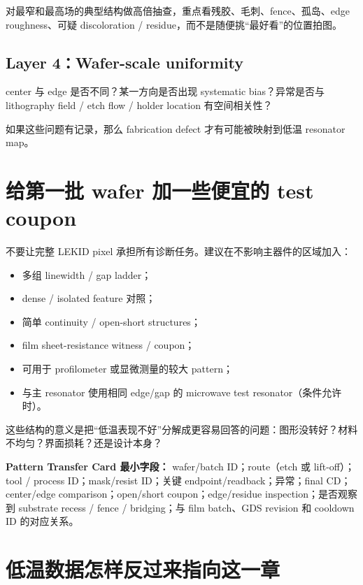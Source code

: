 对最窄和最高场的典型结构做高倍抽查，重点看残胶、毛刺、fence、孤岛、edge roughness、可疑 discoloration / residue，而不是随便挑“最好看”的位置拍图。

\subsection{Layer 4：Wafer-scale uniformity}

center 与 edge 是否不同？某一方向是否出现 systematic bias？异常是否与 lithography field / etch flow / holder location 有空间相关性？

如果这些问题有记录，那么 fabrication defect 才有可能被映射到低温 resonator map。

\section{给第一批 wafer 加一些便宜的 test coupon}

不要让完整 LEKID pixel 承担所有诊断任务。建议在不影响主器件的区域加入：

\begin{itemize}
  \item 多组 linewidth / gap ladder；
  \item dense / isolated feature 对照；
  \item 简单 continuity / open-short structures；
  \item film sheet-resistance witness / coupon；
  \item 可用于 profilometer 或显微测量的较大 pattern；
  \item 与主 resonator 使用相同 edge/gap 的 microwave test resonator（条件允许时）。
\end{itemize}

这些结构的意义是把“低温表现不好”分解成更容易回答的问题：图形没转好？材料不均匀？界面损耗？还是设计本身？

\begin{measurebox}
\textbf{Pattern Transfer Card 最小字段：}
wafer/batch ID；route（etch 或 lift-off）；tool / process ID；mask/resist ID；关键 endpoint/readback；异常；final CD；center/edge comparison；open/short coupon；edge/residue inspection；是否观察到 substrate recess / fence / bridging；与 film batch、GDS revision 和 cooldown ID 的对应关系。
\end{measurebox}

\section{低温数据怎样反过来指向这一章}

